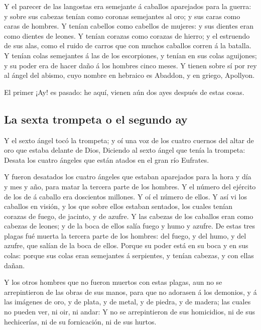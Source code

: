  Y el parecer de las langostas era semejante á caballos
aparejados para la guerra: y sobre sus cabezas tenían como coronas
semejantes al oro; y sus caras como caras de hombres.  Y
tenían cabellos como cabellos de mujeres: y sus dientes eran como
dientes de leones.  Y tenían corazas como corazas de
hierro; y el estruendo de sus alas, como el ruido de carros que con
muchos caballos corren á la batalla.  Y tenían colas
semejantes á las de los escorpiones, y tenían en sus colas aguijones; y
su poder era de hacer daño á los hombres cinco meses.  Y
tienen sobre sí por rey al ángel del abismo, cuyo nombre en hebraico es
Abaddon, y en griego, Apollyon.

 El primer ¡Ay! es pasado: he aquí, vienen aún dos ayes
después de estas cosas.

\hypertarget{la-sexta-trompeta-o-el-segundo-ay}{%
\subsection{La sexta trompeta o el segundo
ay}\label{la-sexta-trompeta-o-el-segundo-ay}}

 Y el sexto ángel tocó la trompeta; y oí una voz de los
cuatro cuernos del altar de oro que estaba delante de Dios,
 Diciendo al sexto ángel que tenía la trompeta: Desata
los cuatro ángeles que están atados en el gran río Eufrates.

 Y fueron desatados los cuatro ángeles que estaban
aparejados para la hora y día y mes y año, para matar la tercera parte
de los hombres.  Y el número del ejército de los de á
caballo era doscientos millones. Y oí el número de ellos.
 Y así vi los caballos en visión, y los que sobre ellos
estaban sentados, los cuales tenían corazas de fuego, de jacinto, y de
azufre. Y las cabezas de los caballos eran como cabezas de leones; y de
la boca de ellos salía fuego y humo y azufre.  De estas
tres plagas fué muerta la tercera parte de los hombres: del fuego, y del
humo, y del azufre, que salían de la boca de ellos. 
Porque su poder está en su boca y en sus colas: porque sus colas eran
semejantes á serpientes, y tenían cabezas, y con ellas dañan.

 Y los otros hombres que no fueron muertos con estas
plagas, aun no se arrepintieron de las obras de sus manos, para que no
adorasen á los demonios, y á las imágenes de oro, y de plata, y de
metal, y de piedra, y de madera; las cuales no pueden ver, ni oir, ni
andar:  Y no se arrepintieron de sus homicidios, ni de
sus hechicerías, ni de su fornicación, ni de sus hurtos.

